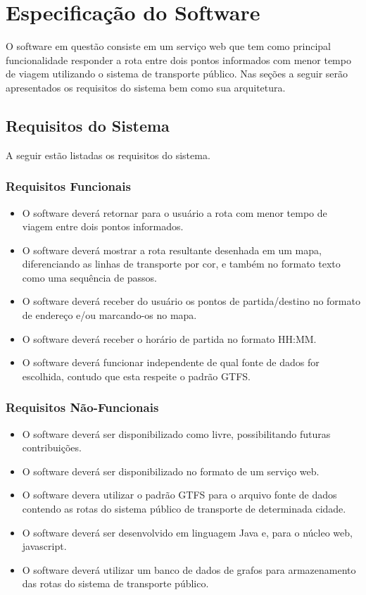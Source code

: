 
\chapter{Especificação do Software}
O software em questão consiste em um serviço web que tem como principal funcionalidade responder a rota entre dois pontos informados com menor tempo de viagem utilizando o sistema de transporte público. 
Nas seções a seguir serão apresentados os requisitos do sistema bem como sua arquitetura.

\section{Requisitos do Sistema}
A seguir estão listadas os requisitos do sistema.

\subsection{Requisitos Funcionais}
\begin{itemize}
	\item O software deverá retornar para o usuário a rota com menor tempo de viagem entre dois pontos informados.
	\item O software deverá mostrar a rota resultante desenhada em um mapa, diferenciando as linhas de transporte por cor, e também no formato texto como uma sequência de passos.
	\item O software deverá receber do usuário os pontos de partida/destino no formato de endereço e/ou marcando-os no mapa.
	\item O software deverá receber o horário de partida no formato HH:MM.
	\item O software deverá funcionar independente de qual fonte de dados for escolhida, contudo que esta respeite o padrão GTFS.
\end{itemize}

\subsection{Requisitos Não-Funcionais}
\begin{itemize}
	\item O software deverá ser disponibilizado como livre, possibilitando futuras contribuições.
	\item O software deverá ser disponibilizado no formato de um serviço web.
	\item O software devera utilizar o padrão GTFS para o arquivo fonte de dados contendo as rotas do sistema público de transporte de determinada cidade.
	\item O software deverá ser desenvolvido em linguagem Java e, para o núcleo web, javascript.
	\item O software deverá utilizar um banco de dados de grafos para armazenamento das rotas do sistema de transporte público.
\end{itemize}


